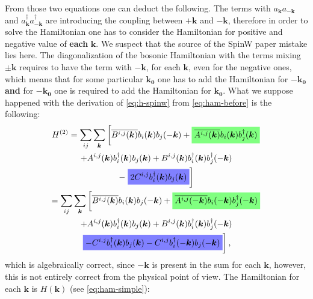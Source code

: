 \documentclass[a4paper,12pt]{article}
\newcommand{\highlightgreen}[1]{%
  \colorbox{green!50}{$\displaystyle#1$}}
\newcommand{\highlightblue}[1]{%
  \colorbox{blue!50}{$\displaystyle#1$}}
\begin{document}
            From those two equations one can deduct the following. The terms with $a_{\boldsymbol{k}}a_{-\boldsymbol{k}}$ 
            and $a^{\dag}_{\boldsymbol{k}}a^{\dag}_{-\boldsymbol{k}}$ are introducing the coupling between $+\boldsymbol{k}$ and $-\boldsymbol{k}$,
            therefore in order to solve the Hamiltonian one has to consider the Hamiltonian for positive and negative value of \textbf{each} $\boldsymbol{k}$.
            We suspect that the source of the SpinW paper \cite{toth2015linear} mistake lies here. The diagonalization of the bosonic Hamiltonian with the terms mixing $\pm\boldsymbol{k}$
            requires to have the term with $-\boldsymbol{k}$, for each $\boldsymbol{k}$, even for the negative ones, 
            which means that for some particular $\boldsymbol{k_0}$ one has to add the Hamiltonian for $-\boldsymbol{k_0}$ \textbf{and} 
            for $-\boldsymbol{k_0}$ one is required to add the Hamiltonian for $\boldsymbol{k_0}$. What we suppose happened with the derivation of \eqref{eq:h-spinw} 
            from \eqref{eq:ham-before} is the following:
            \begin{multline}
                H^{(2)} = \sum_{ij}\sum_{\boldsymbol{k}}\left[\overline{B^{i,j}(\boldsymbol{k})}b_{i}(\boldsymbol{k})b_{j}(-\boldsymbol{k}) +
                \highlightgreen{\overline{A^{i,j}(\boldsymbol{k})}b_{i}(\boldsymbol{k})b^{\dag}_{j}(\boldsymbol{k})}\right. \\+ 
                A^{i,j}(\boldsymbol{k})b^{\dag}_{i}(\boldsymbol{k})b_{j}(\boldsymbol{k}) +
                B^{i,j}(\boldsymbol{k})b^{\dag}_{i}(\boldsymbol{k})b^{\dag}_{j}(-\boldsymbol{k}) \\-
                \left.\highlightblue{2 C^{i,j}b^{\dag}_{i}(\boldsymbol{k})b_{j}(\boldsymbol{k})}\right]\\
                = \sum_{ij}\sum_{\boldsymbol{k}}\left[\overline{B^{i,j}(\boldsymbol{k})}b_{i}(\boldsymbol{k})b_{j}(-\boldsymbol{k}) +
                \highlightgreen{\overline{A^{i,j}(-\boldsymbol{k})}b_{i}(-\boldsymbol{k})b^{\dag}_{j}(-\boldsymbol{k})}\right. \\+ 
                A^{i,j}(\boldsymbol{k})b^{\dag}_{i}(\boldsymbol{k})b_{j}(\boldsymbol{k}) +
                B^{i,j}(\boldsymbol{k})b^{\dag}_{i}(\boldsymbol{k})b^{\dag}_{j}(-\boldsymbol{k}) \\
                \left.\highlightblue{ -C^{i,j}b^{\dag}_{i}(\boldsymbol{k})b_{j}(\boldsymbol{k}) - C^{i,j}b^{\dag}_{i}(-\boldsymbol{k})b_{j}(-\boldsymbol{k})}\right],\\
            \end{multline}
            which is algebraically correct, since $-\boldsymbol{k}$ is present in the sum for each $\boldsymbol{k}$, however, this is not entirely correct from the physical point of view.
            The Hamiltonian for each $\boldsymbol{k}$ is $H(\boldsymbol{k})$ (see \eqref{eq:ham-simple}):
\end{document}
